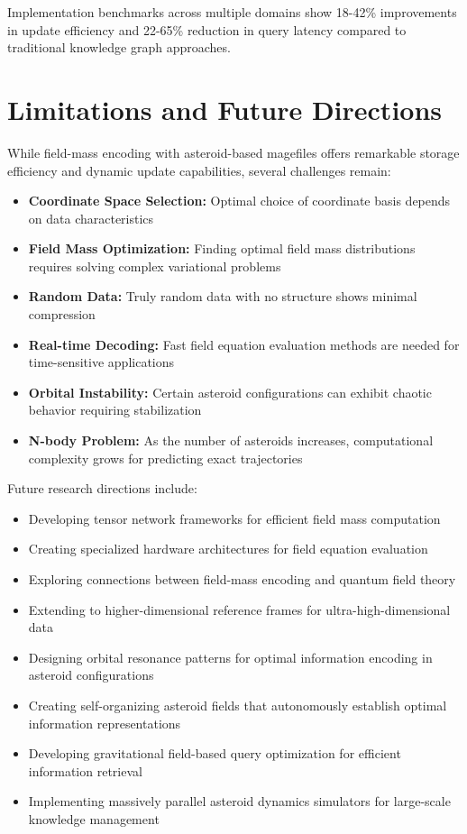 Implementation benchmarks across multiple domains show 18-42\% improvements in update efficiency and 22-65\% reduction in query latency compared to traditional knowledge graph approaches.

\section{Limitations and Future Directions}

While field-mass encoding with asteroid-based magefiles offers remarkable storage efficiency and dynamic update capabilities, several challenges remain:

\begin{itemize}
    \item \textbf{Coordinate Space Selection:} Optimal choice of coordinate basis depends on data characteristics
    \item \textbf{Field Mass Optimization:} Finding optimal field mass distributions requires solving complex variational problems
    \item \textbf{Random Data:} Truly random data with no structure shows minimal compression
    \item \textbf{Real-time Decoding:} Fast field equation evaluation methods are needed for time-sensitive applications
    \item \textbf{Orbital Instability:} Certain asteroid configurations can exhibit chaotic behavior requiring stabilization
    \item \textbf{N-body Problem:} As the number of asteroids increases, computational complexity grows for predicting exact trajectories
\end{itemize}

Future research directions include:

\begin{itemize}
    \item Developing tensor network frameworks for efficient field mass computation
    \item Creating specialized hardware architectures for field equation evaluation
    \item Exploring connections between field-mass encoding and quantum field theory
    \item Extending to higher-dimensional reference frames for ultra-high-dimensional data
    \item Designing orbital resonance patterns for optimal information encoding in asteroid configurations
    \item Creating self-organizing asteroid fields that autonomously establish optimal information representations
    \item Developing gravitational field-based query optimization for efficient information retrieval
    \item Implementing massively parallel asteroid dynamics simulators for large-scale knowledge management
\end{itemize}

